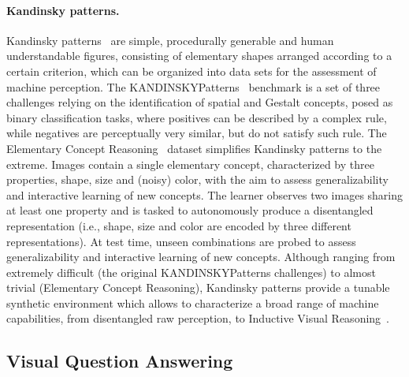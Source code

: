 \paragraph{Kandinsky patterns.}
Kandinsky patterns~\cite{muller2021kandinsky} are simple, procedurally generable and human understandable figures, consisting of elementary shapes arranged according to a certain criterion, which can be organized into data sets for the assessment of machine perception.
%
The KANDINSKYPatterns~\cite{holzinger2021kandinskypatterns} benchmark is a set of three challenges relying on the identification of spatial and Gestalt concepts, posed as binary classification tasks, where positives can be described by a complex rule, while negatives are perceptually very similar, but do not satisfy such rule.
The Elementary Concept Reasoning~\cite{stammer2022interactive} dataset simplifies Kandinsky patterns to the extreme. Images contain a single elementary concept, characterized by three properties, shape, size and (noisy) color, with the aim to assess generalizability and interactive learning of new concepts. The learner observes two images sharing at least one property and is tasked to autonomously produce a disentangled representation (i.e., shape, size and color are encoded by three different representations). At test time, unseen combinations are probed to assess generalizability and interactive learning of new concepts.
%
Although ranging from extremely difficult (the original KANDINSKYPatterns challenges) to almost trivial (Elementary Concept Reasoning), Kandinsky patterns provide a tunable synthetic environment which allows to characterize a broad range of machine capabilities, from disentangled raw perception, to Inductive Visual Reasoning~\cite{shindo2023ailp}.

\iffalse
\subsection{Visual Question Answering}%

